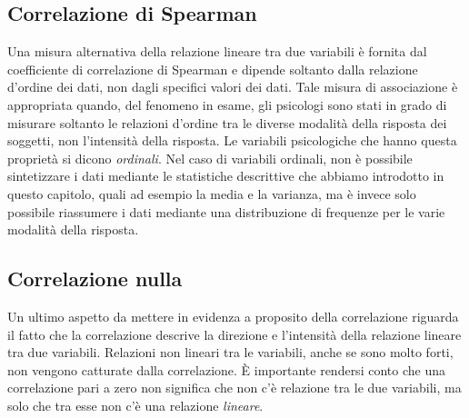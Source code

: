 \documentclass[
  10pt,
  italian,
  a4paper,
  extrafontsizes,onecolumn,openright
  ]{memoir}
\theoremstyle{definition}
\theoremstyle{definition}
\theoremstyle{definition}
\theoremstyle{definition}
\theoremstyle{remark}
\begin{document}
\hypertarget{correlazione-di-spearman}{%
\subsection{Correlazione di Spearman}\label{correlazione-di-spearman}}

Una misura alternativa della relazione lineare tra due variabili è
fornita dal coefficiente di correlazione di Spearman e dipende soltanto
dalla relazione d'ordine dei dati, non dagli specifici valori dei dati.
Tale misura di associazione è appropriata quando, del fenomeno in esame,
gli psicologi sono stati in grado di misurare soltanto le relazioni
d'ordine tra le diverse modalità della risposta dei soggetti, non
l'intensità della risposta. Le variabili psicologiche che hanno questa
proprietà si dicono \emph{ordinali}. Nel caso di variabili ordinali, non è
possibile sintetizzare i dati mediante le statistiche descrittive che
abbiamo introdotto in questo capitolo, quali ad esempio la media e la
varianza, ma è invece solo possibile riassumere i dati mediante una
distribuzione di frequenze per le varie modalità della risposta.

\hypertarget{correlazione-nulla}{%
\subsection{Correlazione nulla}\label{correlazione-nulla}}

Un ultimo aspetto da mettere in evidenza a proposito della correlazione riguarda il fatto che la correlazione descrive la direzione e l'intensità della relazione lineare tra due variabili. Relazioni non lineari tra le variabili, anche se sono molto forti, non vengono catturate dalla correlazione. È importante rendersi conto che una correlazione pari a zero non significa che non c'è relazione tra le due variabili, ma solo che tra esse non c'è una relazione \emph{lineare}.
\end{document}
